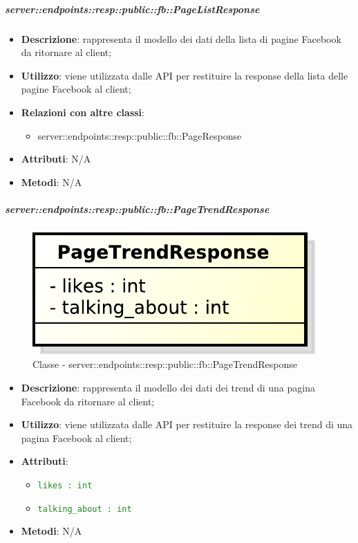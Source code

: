     \subparagraph{server::endpoints::resp::public::fb::PageListResponse} %
    \label{subp:bdsm_app_server_endpoints_resp_public_fb_pagelistresponse}
    \begin{itemize}
      \item \textbf{Descrizione}: rappresenta il modello dei dati della lista di pagine Facebook da ritornare al client;
      \item \textbf{Utilizzo}: viene utilizzata dalle API per restituire la response della lista delle pagine Facebook al client;
      \item \textbf{Relazioni con altre classi}:
        \begin{itemize}
          \item server::endpoints::resp::public::fb::PageResponse
        \end{itemize}
	  \item \textbf{Attributi}: N/A
	  \item \textbf{Metodi}: N/A
      \end{itemize}

    \subparagraph{server::endpoints::resp::public::fb::PageTrendResponse} %
    \label{subp:bdsm_app_server_endpoints_resp_public_fb_pagetrendresponse}
	\begin{figure}[!htbp]
		\centering
		\centerline{\includegraphics[scale=0.6]{./images/server/classes/endpoints/fb/page_trend_response.pdf}}
		\caption{Classe - server::endpoints::resp::public::fb::PageTrendResponse}
	\end{figure}
    \begin{itemize}
      \item \textbf{Descrizione}: rappresenta il modello dei dati dei trend di una pagina Facebook da ritornare al client;
      \item \textbf{Utilizzo}: viene utilizzata dalle API per restituire la response dei trend di una pagina Facebook al client;
	  \item \textbf{Attributi}:
	  	\begin{itemize}
	  		\item \textcolor{forestgreen}{\texttt{likes : int}}
	  		\item \textcolor{forestgreen}{\texttt{talking\_about : int}}
	  	\end{itemize}
	  \item \textbf{Metodi}: N/A
    \end{itemize}

